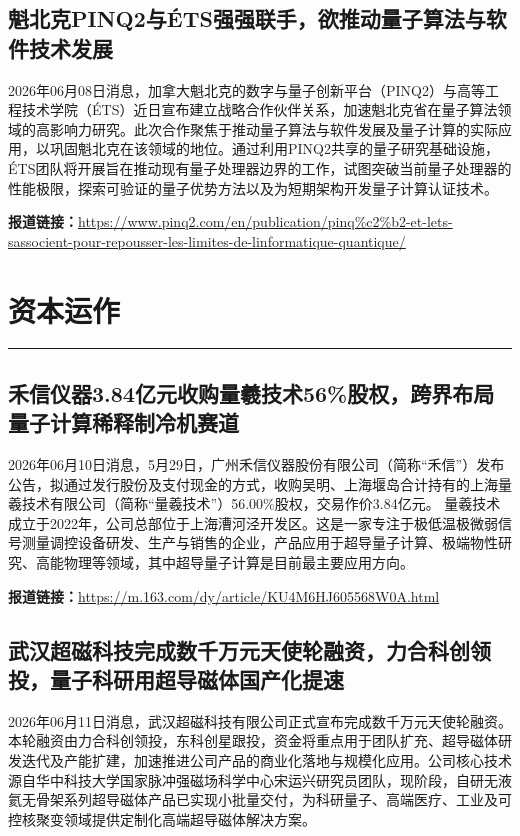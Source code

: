 \documentclass[12pt,a4paper]{ctexart}
\begin{document}
\subsection{ 魁北克PINQ2与ÉTS强强联手，欲推动量子算法与软件技术发展 }

2026年06月08日消息，加拿大魁北克的数字与量子创新平台（PINQ2）与高等工程技术学院（ÉTS）近日宣布建立战略合作伙伴关系，加速魁北克省在量子算法领域的高影响力研究。此次合作聚焦于推动量子算法与软件发展及量子计算的实际应用，以巩固魁北克在该领域的地位。通过利用PINQ2共享的量子研究基础设施，ÉTS团队将开展旨在推动现有量子处理器边界的工作，试图突破当前量子处理器的性能极限，探索可验证的量子优势方法以及为短期架构开发量子计算认证技术。

\noindent\textbf{报道链接：}\url{https://www.pinq2.com/en/publication/pinq\%c2\%b2-et-lets-sassocient-pour-repousser-les-limites-de-linformatique-quantique/}


\newpage
\section{资本运作}
\vspace{-0.5em}
\noindent\rule{\linewidth}{1.5pt}

\subsection{ 禾信仪器3.84亿元收购量羲技术56\%股权，跨界布局量子计算稀释制冷机赛道 }

2026年06月10日消息，5月29日，广州禾信仪器股份有限公司（简称“禾信”）发布公告，拟通过发行股份及支付现金的方式，收购吴明、上海堰岛合计持有的上海量羲技术有限公司（简称“量羲技术”）56.00\%股权，交易作价3.84亿元。 量羲技术成立于2022年，公司总部位于上海漕河泾开发区。这是一家专注于极低温极微弱信号测量调控设备研发、生产与销售的企业，产品应用于超导量子计算、极端物性研究、高能物理等领域，其中超导量子计算是目前最主要应用方向。

\noindent\textbf{报道链接：}\url{https://m.163.com/dy/article/KU4M6HJ605568W0A.html}

\subsection{ 武汉超磁科技完成数千万元天使轮融资，力合科创领投，量子科研用超导磁体国产化提速 }

2026年06月11日消息，武汉超磁科技有限公司正式宣布完成数千万元天使轮融资。本轮融资由力合科创领投，东科创星跟投，资金将重点用于团队扩充、超导磁体研发迭代及产能扩建，加速推进公司产品的商业化落地与规模化应用。公司核心技术源自华中科技大学国家脉冲强磁场科学中心宋运兴研究员团队，现阶段，自研无液氦无骨架系列超导磁体产品已实现小批量交付，为科研量子、高端医疗、工业及可控核聚变领域提供定制化高端超导磁体解决方案。
\end{document}
